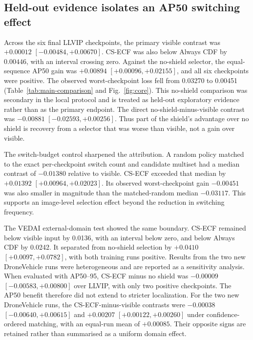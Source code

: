 \documentclass[preprint,11pt]{elsarticle}
\begin{document}
\subsection{Held-out evidence isolates an AP50 switching effect}

Across the six final LLVIP checkpoints, the primary visible contrast was
\(+0.00012\) \([-0.00484,+0.00670]\). CS-ECF was also below Always CDF by
\(0.00446\), with an interval crossing zero. Against the no-shield
selector, the equal-sequence AP50 gain was \(+0.00894\)
\([+0.00096,+0.02155]\), and all six checkpoints were positive. The observed
worst-checkpoint loss fell from 0.03270 to 0.00451
(Table~\ref{tab:main-comparison} and Fig.~\ref{fig:core}).
This no-shield comparison was secondary in the local protocol and is treated
as held-out exploratory evidence rather than as the primary endpoint.
The direct no-shield-minus-visible contrast was \(-0.00881\)
\([-0.02593,+0.00256]\). Thus part of the shield's advantage over no shield is
recovery from a selector that was worse than visible, not a gain over visible.

The switch-budget control sharpened the attribution. A random policy matched
to the exact per-checkpoint switch count and candidate multiset had a median
contrast of \(-0.01380\) relative to visible. CS-ECF exceeded that median by
\(+0.01392\) \([+0.00964,+0.02023]\). Its observed worst-checkpoint gain
\(-0.00451\) was also smaller in magnitude than the matched-random median
\(-0.03117\). This supports an image-level selection effect beyond the
reduction in switching frequency.

The VEDAI external-domain test showed the same boundary. CS-ECF remained below
visible input by 0.0136, with an interval below zero, and below Always CDF by
0.0242. It separated from no-shield selection by \(+0.0410\)
\([+0.0097,+0.0782]\), with both training runs positive. Results from the two
new DroneVehicle runs were heterogeneous and are reported as a sensitivity
analysis. When evaluated with AP50--95, CS-ECF minus no shield was \(-0.00009\)
\([-0.00583,+0.00800]\) over LLVIP, with only two positive checkpoints. The
AP50 benefit therefore did not extend to stricter localization. For the two
new DroneVehicle runs, the CS-ECF-minus-visible contrasts were \(-0.00038\)
\([-0.00640,+0.00615]\) and \(+0.00207\) \([+0.00122,+0.00260]\) under
confidence-ordered matching, with an equal-run mean of \(+0.00085\). Their
opposite signs are retained rather than summarised as a uniform domain effect.
\end{document}
